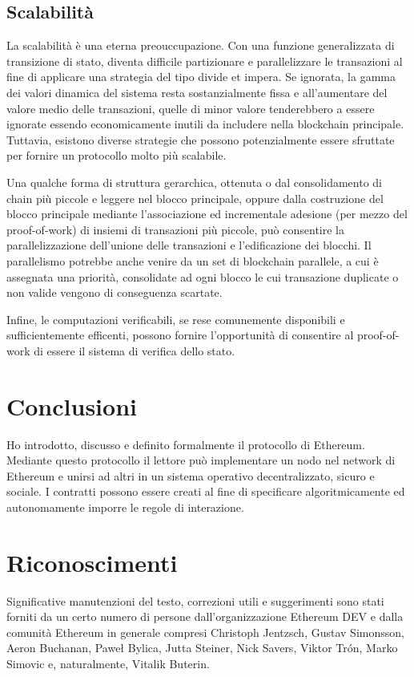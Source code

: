 \documentclass[9pt,oneside]{amsart}
\begin{document}
\begin{multicols}{2}
\subsection{Scalabilità}

La scalabilità è una eterna preouccupazione. Con una funzione generalizzata di transizione di stato, diventa difficile partizionare e parallelizzare le transazioni al fine di applicare una strategia del tipo divide et impera. Se ignorata, la gamma dei valori dinamica del sistema resta sostanzialmente fissa e all'aumentare del valore medio delle transazioni, quelle di minor valore tenderebbero a essere ignorate essendo economicamente inutili da includere nella blockchain principale. Tuttavia, esistono diverse strategie che possono potenzialmente essere sfruttate per fornire un protocollo molto più scalabile.

Una qualche forma di struttura gerarchica, ottenuta o dal consolidamento di chain più piccole e leggere nel blocco principale, oppure dalla costruzione del blocco principale mediante l'associazione ed incrementale adesione (per mezzo del proof-of-work) di insiemi di transazioni più piccole, può consentire la parallelizzazione dell'unione delle transazioni e l'edificazione dei blocchi. Il parallelismo potrebbe anche venire da un set di blockchain parallele, a cui è assegnata una priorità, consolidate ad ogni blocco le cui transazione duplicate o non valide vengono di conseguenza scartate.

Infine, le computazioni verificabili, se rese comunemente disponibili e sufficientemente efficenti, possono fornire l'opportunità di consentire al proof-of-work di essere il sistema di verifica dello stato.

\section{Conclusioni} \label{ch:conclusion}

Ho introdotto, discusso e definito formalmente il protocollo di Ethereum. Mediante questo protocollo il lettore può implementare un nodo nel network di Ethereum e unirsi ad altri in un sistema operativo  decentralizzato, sicuro e sociale. I contratti possono essere creati al fine di specificare algoritmicamente ed autonomamente imporre le regole di interazione.

\section{Riconoscimenti}

Significative manutenzioni del testo, correzioni utili e suggerimenti sono stati forniti da un certo numero di persone dall'organizzazione Ethereum DEV e dalla comunità Ethereum in generale compresi Christoph Jentzsch, Gustav Simonsson, Aeron Buchanan, Pawe\l{} Bylica, Jutta Steiner, Nick Savers, Viktor Tr\'{o}n, Marko Simovic e, naturalmente, Vitalik Buterin.




\end{multicols}
\end{document}
